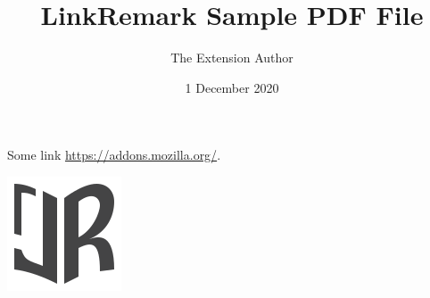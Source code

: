 \documentclass{article}
\title{LinkRemark Sample PDF File}
\author{The Extension Author}
\date{1 December 2020}
\begin{document}
\maketitle
\newpage
Some link \url{https://addons.mozilla.org/}.

\begin{center}
\includegraphics[width=.5\textwidth]{lr-128.png}
\end{center}
\end{document}
